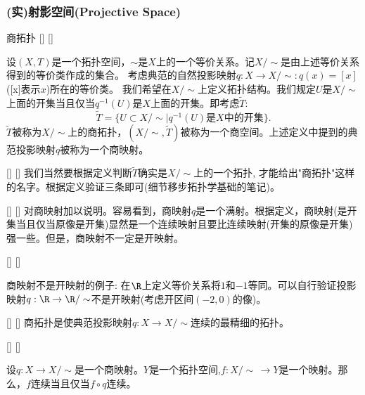 \documentclass[UTF8]{ctexart}
\begin{document}
    \subsubsection{(实)射影空间(Projective Space)}
    \begin{dfn}
        []
        {商拓扑}
        []
        []

        设$(X,T)$是一个拓扑空间，$\sim$是$X$上的一个等价关系。记$X / \sim$是由上述等价关系得到的等价类作成的集合。
        考虑典范的自然投影映射$q : X \rightarrow X/\sim : q(x) = [x]$([x]表示$x$)所在的等价类。
        我们希望在$X / \sim$上定义拓扑结构。我们规定$U$是$X / \sim$上面的开集当且仅当$q^{-1}(U)$是$X$上面的开集。即考虑$\tilde{T}$:
        \[
            \tilde{T} = \{ U \subset X/\sim | q^{-1}(U) \text{是} X \text{中的开集} \}.
        \]
        $\tilde{T}$被称为$X/\sim$上的商拓扑，$(X/\sim,\tilde{T})$被称为一个商空间。上述定义中提到的典范投影映射$q$被称为一个商映射。
    \end{dfn}

    \begin{rmk}
        []
        {}
        []
        []
        我们当然要根据定义判断$\tilde{T}$确实是$X/\sim$上的一个拓扑, 才能给出"商拓扑"这样的名字。根据定义验证三条即可(细节移步拓扑学基础的笔记)。
    \end{rmk}

    
    \begin{rmk}
        []
        {}
        []
        []
        对商映射加以说明。容易看到，商映射$q$是一个满射。根据定义，商映射(是开集当且仅当原像是开集)显然是一个连续映射且要比连续映射(开集的原像是开集)强一些。但是，商映射不一定是开映射。
    \end{rmk}

    \begin{cxmp}
        []
        {}
        []
        []

        商映射不是开映射的例子: 在$\R$上定义等价关系将$1$和$-1$等同。可以自行验证投影映射$q : \R \rightarrow \R/\sim$不是开映射(考虑开区间$(-2,0)$的像)。
    \end{cxmp}
    
    \begin{rmk}
        []
        {}
        []
        []
        商拓扑是使典范投影映射$q: X \rightarrow X/\sim$连续的最精细的拓扑。
    \end{rmk}

    \begin{lma}
        []
        {}
        []
        []

        设$q : X \rightarrow X/\sim$是一个商映射。$Y$是一个拓扑空间,$f : X/\sim \, \rightarrow Y$是一个映射。那么，$f$连续当且仅当$f \circ q$连续。   
    \end{lma}
\end{document}
